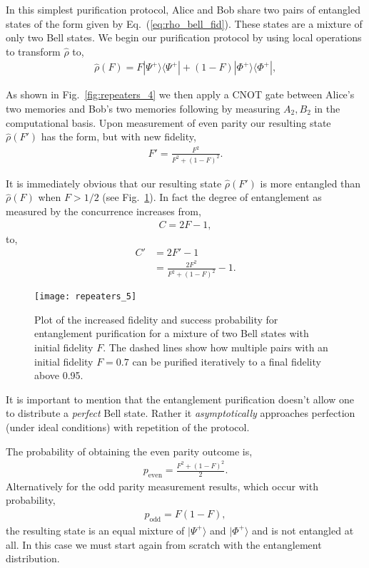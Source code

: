 In this simplest purification protocol, Alice and Bob share two pairs of entangled states of the form given by Eq.~(\ref{eq:rho_bell_fid}). These states are a mixture of only two Bell states. We begin our purification protocol by using local operations to transform $\hat\rho$ to,
\begin{align}\label{eq:rho_bell_fid_dash}
\hat\rho(F)=F |\Psi^+\rangle \langle \Psi^+|+(1-F) |\Phi^+\rangle \langle \Phi^+|,
\end{align}

As shown in Fig.~\ref{fig:repeaters_4} we then apply a CNOT gate between Alice's two memories and Bob's two memories following by measuring $A_2, B_2$ in the computational basis. Upon measurement of even parity our resulting state $\hat\rho(F')$ has the form, but with new fidelity,
\begin{align}
	F'=\frac{F^2}{F^2+(1-F)^2}.
\end{align}

It is immediately obvious that our resulting state $\hat\rho(F')$ is more entangled than $\hat\rho(F)$ when \mbox{$F>1/2$} (see Fig.~\ref{fig:rep_purification}). In fact the degree of entanglement as measured by the concurrence increases from,
\begin{align}
	C=2 F-1,
\end{align}
to,
\begin{align}
C' &=2 F'-1 \nonumber\\
&= \frac{2 F^2}{F^2+(1-F)^2}-1.
\end{align}

\begin{figure}[!htbp]
\texttt{[image: repeaters\_5]}
\captionspacefig \caption{Plot of the increased fidelity and success probability for entanglement purification for a mixture of two Bell states with initial fidelity $F$. The dashed lines show how multiple pairs with an initial fidelity $F=0.7$ can be purified iteratively to a final fidelity above 0.95.} 
\label{fig:rep_purification}
\end{figure} 

It is important to mention that the entanglement purification doesn't allow one to distribute a \textit{perfect} Bell state. Rather it \textit{asymptotically} approaches perfection (under ideal conditions) with repetition of the protocol.

The probability of obtaining the even parity outcome is,
\begin{align}
	p_\mathrm{even}=\frac{F^2+(1-F)^2}{2}.
\end{align}
Alternatively for the odd parity measurement results, which occur with probability,
\begin{align}
	p_\mathrm{odd}=F(1-F),
\end{align}
the resulting state is an equal mixture of $|\Psi^+\rangle$ and $|\Phi^+\rangle$ and is not entangled at all. In this case we must start again from scratch with the entanglement distribution.

